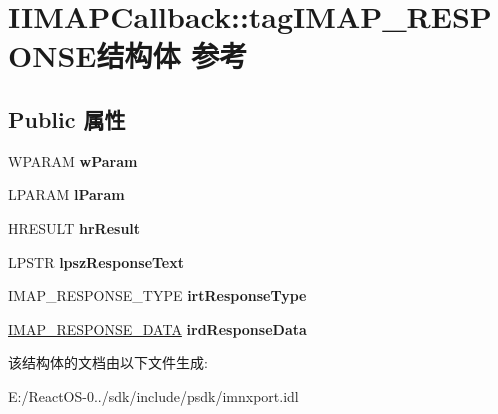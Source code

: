 \hypertarget{struct_i_i_m_a_p_callback_1_1tag_i_m_a_p___r_e_s_p_o_n_s_e}{}\section{I\+I\+M\+A\+P\+Callback\+:\+:tag\+I\+M\+A\+P\+\_\+\+R\+E\+S\+P\+O\+N\+S\+E结构体 参考}
\label{struct_i_i_m_a_p_callback_1_1tag_i_m_a_p___r_e_s_p_o_n_s_e}
\subsection*{Public 属性}
\begin{DoxyCompactItemize}
\item 
\mbox{\label{struct_i_i_m_a_p_callback_1_1tag_i_m_a_p___r_e_s_p_o_n_s_e_aa8911031a387a96e39f1911bf240e11a}} 
W\+P\+A\+R\+AM {\bfseries w\+Param}
\item 
\mbox{\label{struct_i_i_m_a_p_callback_1_1tag_i_m_a_p___r_e_s_p_o_n_s_e_aceae29a4c38cb55d20c94f943e17d116}} 
L\+P\+A\+R\+AM {\bfseries l\+Param}
\item 
\mbox{\label{struct_i_i_m_a_p_callback_1_1tag_i_m_a_p___r_e_s_p_o_n_s_e_ab4f8064ea6abc66eaa27192254df9fee}} 
H\+R\+E\+S\+U\+LT {\bfseries hr\+Result}
\item 
\mbox{\label{struct_i_i_m_a_p_callback_1_1tag_i_m_a_p___r_e_s_p_o_n_s_e_a167e42493238b0256cc4942560e89409}} 
L\+P\+S\+TR {\bfseries lpsz\+Response\+Text}
\item 
\mbox{\label{struct_i_i_m_a_p_callback_1_1tag_i_m_a_p___r_e_s_p_o_n_s_e_a4dbd2ed1d77f768506ea39b7b8e2da66}} 
I\+M\+A\+P\+\_\+\+R\+E\+S\+P\+O\+N\+S\+E\+\_\+\+T\+Y\+PE {\bfseries irt\+Response\+Type}
\item 
\mbox{\label{struct_i_i_m_a_p_callback_1_1tag_i_m_a_p___r_e_s_p_o_n_s_e_a437d018f2969d8bb20df943d589498cf}} 
\hyperlink{union_i_i_m_a_p_callback_1_1tag_i_m_a_p___r_e_s_p_o_n_s_e___d_a_t_a}{I\+M\+A\+P\+\_\+\+R\+E\+S\+P\+O\+N\+S\+E\+\_\+\+D\+A\+TA} {\bfseries ird\+Response\+Data}
\end{DoxyCompactItemize}


该结构体的文档由以下文件生成\+:\begin{DoxyCompactItemize}
\item 
E\+:/\+React\+O\+S-\/0../sdk/include/psdk/imnxport.\+idl\end{DoxyCompactItemize}
